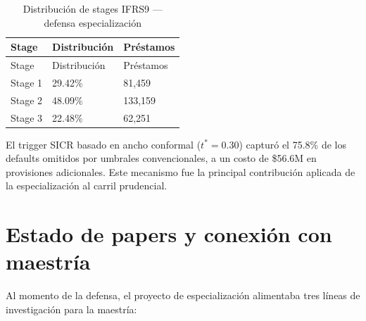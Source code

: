 \documentclass[
  spanish,
  11pt,
  letterpaper,
]{scrbook}
\theoremstyle{plain}
\theoremstyle{remark}
\begin{document}
\begin{longtable}[]{@{}lll@{}}
\caption{Distribución de stages IFRS9 --- defensa
especialización}\label{tbl-snapshot-stages}\tabularnewline
\toprule\noalign{}
Stage & Distribución & Préstamos \\
\midrule\noalign{}
\endfirsthead
\toprule\noalign{}
Stage & Distribución & Préstamos \\
\midrule\noalign{}
\endhead
\bottomrule\noalign{}
\endlastfoot
Stage 1 & 29.42\% & 81,459 \\
Stage 2 & 48.09\% & 133,159 \\
Stage 3 & 22.48\% & 62,251 \\
\end{longtable}

El trigger SICR basado en ancho conformal (\(t^* = 0.30\)) capturó el
75.8\% de los defaults omitidos por umbrales convencionales, a un costo
de \$56.6M en provisiones adicionales. Este mecanismo fue la principal
contribución aplicada de la especialización al carril prudencial.

\section{Estado de papers y conexión con
maestría}\label{estado-de-papers-y-conexiuxf3n-con-maestruxeda}

Al momento de la defensa, el proyecto de especialización alimentaba tres
líneas de investigación para la maestría:
\end{document}
